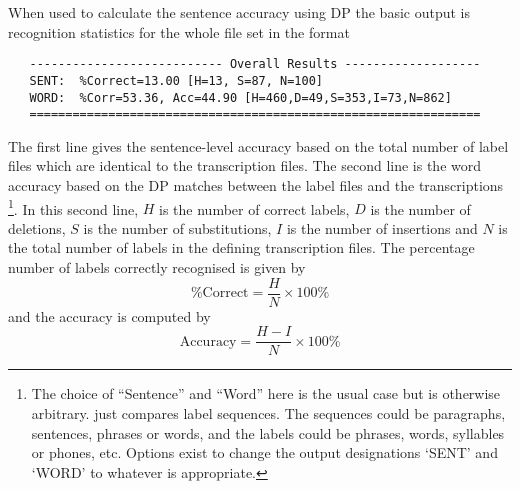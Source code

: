 When used to calculate the sentence accuracy using DP the basic 
output is recognition statistics for the whole file set in the format
\begin{verbatim}
   --------------------------- Overall Results -------------------
   SENT:  %Correct=13.00 [H=13, S=87, N=100]
   WORD:  %Corr=53.36, Acc=44.90 [H=460,D=49,S=353,I=73,N=862]
   ===============================================================
\end{verbatim}
The first line gives the sentence-level accuracy based on the 
total number of label files which are identical to the transcription
files.  The second line is the word accuracy based on the DP matches
between the label files and the transcriptions \footnote{
The choice of ``Sentence'' and ``Word'' here is the usual
case but is otherwise arbitrary.
 just compares label sequences.  The sequences
could be paragraphs, sentences, phrases or words, and the labels
could be phrases, words, syllables or phones, etc.  Options exist
to change the output designations `SENT' and `WORD' to whatever
is appropriate.}.
In this second line,
$H$ is the number of correct labels, $D$ is the number of deletions,
$S$ is the number of substitutions, $I$ is the number of insertions and
$N$ is the total number of labels in the defining transcription files.
The percentage number of labels correctly recognised is given by
\begin{equation}
   \mbox{\%Correct} = \frac{H}{N} \times 100\%
\end{equation}
and the accuracy is computed by
\begin{equation}
   \mbox{Accuracy} = \frac{H-I}{N} \times 100\%
\end{equation}


